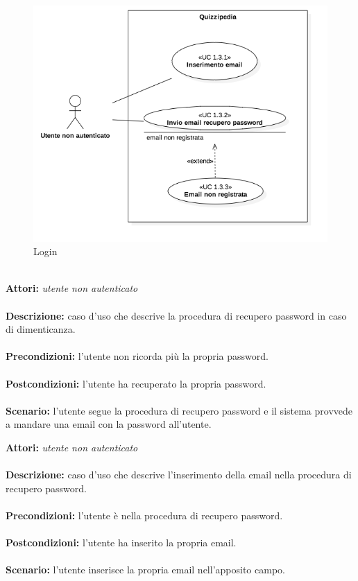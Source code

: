 \documentclass[a4paper,11pt]{article}
\begin{document}
\begin{figure}[h!]
\centering
\includegraphics[scale=0.6]{../immagini/UC1_3.png}
\caption{Login}
\end{figure}
\ \\
\textbf{Attori:} \textit{utente non autenticato}
\\ \\
\textbf{Descrizione:} caso d'uso che descrive la procedura di recupero password in caso di dimenticanza.\\
\\
\textbf{Precondizioni:} l'utente non ricorda più la propria password.\\
\\
\textbf{Postcondizioni:} l’utente ha recuperato la propria password.\\
\\
\textbf{Scenario:} l’utente segue la procedura di recupero password e il sistema provvede a mandare una email con la password all'utente.\\



\textbf{Attori:} \textit{utente non autenticato}
\\ \\
\textbf{Descrizione:} caso d'uso che descrive l'inserimento della email nella procedura di recupero password.\\
\\
\textbf{Precondizioni:} l'utente è nella procedura di recupero password.\\
\\
\textbf{Postcondizioni:} l’utente ha inserito la propria email.\\
\\
\textbf{Scenario:} l’utente inserisce la propria email nell'apposito campo.\\
\end{document}
